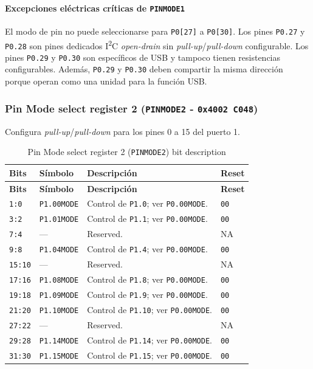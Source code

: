 \paragraph{Excepciones eléctricas críticas de \texttt{PINMODE1}}
El modo de pin no puede seleccionarse para \texttt{P0[27]} a \texttt{P0[30]}. Los pines \texttt{P0.27} y \texttt{P0.28} son pines dedicados I\textsuperscript{2}C \textit{open-drain} sin \textit{pull-up}/\textit{pull-down} configurable. Los pines \texttt{P0.29} y \texttt{P0.30} son específicos de USB y tampoco tienen resistencias configurables. Además, \texttt{P0.29} y \texttt{P0.30} deben compartir la misma dirección porque operan como una unidad para la función USB.

\subsubsection{Pin Mode select register 2 (\texttt{PINMODE2} - \texttt{0x4002 C048})}
Configura \textit{pull-up}/\textit{pull-down} para los pines 0 a 15 del puerto 1.

\begin{longtable}{|>{\raggedright\arraybackslash}p{}|>{\raggedright\arraybackslash}p{}|>{\raggedright\arraybackslash}p{}|>{\centering\arraybackslash}p{}|}
\caption{Pin Mode select register 2 (\texttt{PINMODE2}) bit description}\\
\hline
\textbf{Bits} & \textbf{Símbolo} & \textbf{Descripción} & \textbf{Reset} \\
\hline
\endfirsthead
\hline
\textbf{Bits} & \textbf{Símbolo} & \textbf{Descripción} & \textbf{Reset} \\
\hline
\endhead
\texttt{1:0} & \texttt{P1.00MODE} & Control de \texttt{P1.0}; ver \texttt{P0.00MODE}. & \texttt{00} \\
\hline
\texttt{3:2} & \texttt{P1.01MODE} & Control de \texttt{P1.1}; ver \texttt{P0.00MODE}. & \texttt{00} \\
\hline
\texttt{7:4} & --- & Reserved. & NA \\
\hline
\texttt{9:8} & \texttt{P1.04MODE} & Control de \texttt{P1.4}; ver \texttt{P0.00MODE}. & \texttt{00} \\
\hline
\texttt{15:10} & --- & Reserved. & NA \\
\hline
\texttt{17:16} & \texttt{P1.08MODE} & Control de \texttt{P1.8}; ver \texttt{P0.00MODE}. & \texttt{00} \\
\hline
\texttt{19:18} & \texttt{P1.09MODE} & Control de \texttt{P1.9}; ver \texttt{P0.00MODE}. & \texttt{00} \\
\hline
\texttt{21:20} & \texttt{P1.10MODE} & Control de \texttt{P1.10}; ver \texttt{P0.00MODE}. & \texttt{00} \\
\hline
\texttt{27:22} & --- & Reserved. & NA \\
\hline
\texttt{29:28} & \texttt{P1.14MODE} & Control de \texttt{P1.14}; ver \texttt{P0.00MODE}. & \texttt{00} \\
\hline
\texttt{31:30} & \texttt{P1.15MODE} & Control de \texttt{P1.15}; ver \texttt{P0.00MODE}. & \texttt{00} \\
\hline
\end{longtable}

